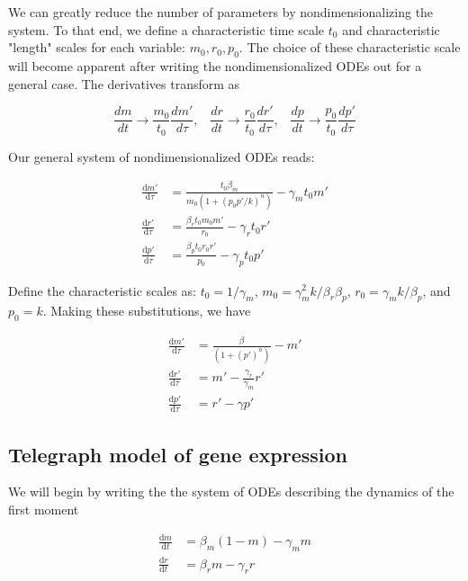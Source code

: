 \documentclass{ucetd}
\begin{document}
\begin{appendices}
We can greatly reduce the number of parameters by nondimensionalizing the system. To that end, we define a characteristic time scale $t_{0}$ and characteristic "length" scales for each variable: $m_{0}, r_{0}, p_{0}$. The choice of these characteristic scale will become apparent after writing the nondimensionalized ODEs out for a general case. The derivatives transform as

\begin{equation*}
\frac{dm}{dt} \rightarrow \frac{m_{0}}{t_{0}}\frac{dm'}{d\tau}, \;\;\; \frac{dr}{dt} \rightarrow \frac{r_{0}}{t_{0}}\frac{dr'}{d\tau},  \;\;\; \frac{dp}{dt} \rightarrow \frac{p_{0}}{t_{0}}\frac{dp'}{d\tau} 
\end{equation*}

Our general system of nondimensionalized ODEs reads:


\begin{align*}
\frac{\mathrm{d}m'}{\mathrm{d}\tau} &= \frac{t_0\beta_{m}}{m_0(1 + (p_{0}p'/k)^n)} - \gamma_m t_{0}m'\\
\frac{\mathrm{d}r'}{\mathrm{d}\tau} &= \frac{\beta_{r} t_{0}m_{0} m'}{r_0} - \gamma_r t_{0}r'\\
\frac{\mathrm{d}p'}{\mathrm{d}\tau} &= \frac{\beta_{p} t_{0}r_{0} r'}{p_{0}} - \gamma_{p} t_{0} p'
\end{align*}

Define the characteristic scales as: $t_{0} = 1/\gamma_{m}$, $m_{0}=\gamma_{m}^{2}k/\beta_{r}\beta_{p}$, $r_{0} = \gamma_{m}k/\beta_{p}$, and $p_{0} = k$. Making these substitutions, we have

\begin{align*}
\frac{\mathrm{d}m'}{\mathrm{d}\tau} &= \frac{\beta}{(1 + (p')^n)} - m'\\
\frac{\mathrm{d}r'}{\mathrm{d}\tau} &= m' - \frac{\gamma_{r}}{\gamma_{m}}r'\\
\frac{\mathrm{d}p'}{\mathrm{d}\tau} &= r' - \gamma p'
\end{align*}

\subsection{Telegraph model of gene expression}

We will begin by writing the the system of ODEs describing the dynamics of the first moment

\begin{align}
\frac{\mathrm{d}m}{\mathrm{d}t} &= \beta_{m}(1-m) - \gamma_m m\\
\frac{\mathrm{d}r}{\mathrm{d}t} &= \beta_{r} m - \gamma_r r\\
\end{align}


\end{appendices}
\end{document}
